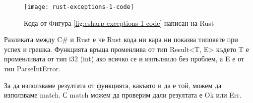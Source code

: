 \begin{figure}[!htb]
  \texttt{[image: rust-exceptions-1-code]}
  \centering
  \caption{Кода от Фигура \ref{fig:csharp-exceptions-1-code} написан на Rust}
  \label{fig:rust-exceptions-1-code}
\end{figure}

Разликата между C\# и Rust е че Rust кода ни кара ни показва типовете при успех
и грешка. Функцията връща променлива от тип Result<T, E> където T е
променливата от тип i32 (int) ако всичко се и изпълнило без проблем, а E е от
тип ParseIntError.

За да използваме резултата от функцията, какъвто и да е той, можем да
използваме match. С match можем да проверим дали резултата е Ok или Err.
